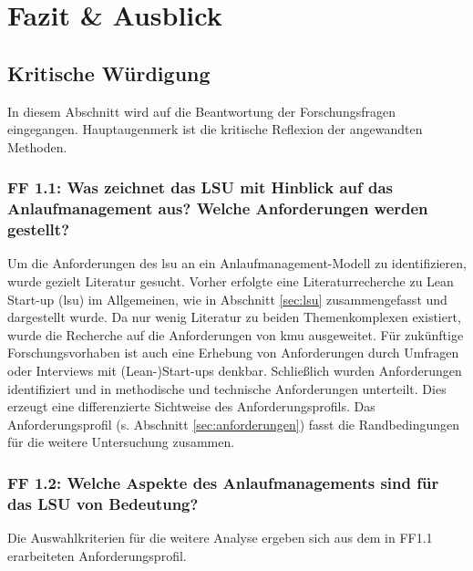 \chapter{Fazit \& Ausblick}\label{sec:fazit}

\section{Kritische Würdigung}

In diesem Abschnitt wird auf die Beantwortung der Forschungsfragen eingegangen. Hauptaugenmerk ist die kritische Reflexion der angewandten Methoden. 

\subsection*{FF 1.1: Was zeichnet das LSU mit Hinblick auf das Anlaufmanagement aus? Welche Anforderungen werden gestellt?}
Um die Anforderungen des \gls{lsu} an ein Anlaufmanagement-Modell zu identifizieren, wurde gezielt Literatur gesucht. 
Vorher erfolgte eine Literaturrecherche zu Lean Start-up (\gls{lsu}) im Allgemeinen, wie in Abschnitt \ref{sec:lsu} zusammengefasst und dargestellt wurde.
Da nur wenig Literatur zu beiden Themenkomplexen existiert, wurde die Recherche auf die Anforderungen von \gls{kmu} ausgeweitet. Für zukünftige Forschungsvorhaben ist auch eine Erhebung von Anforderungen durch Umfragen oder Interviews mit (Lean-)Start-ups denkbar. Schließlich wurden Anforderungen identifiziert und in methodische und technische Anforderungen unterteilt. Dies erzeugt eine differenzierte Sichtweise des Anforderungsprofils. Das Anforderungsprofil (s. Abschnitt \ref{sec:anforderungen}) fasst die Randbedingungen für die weitere Untersuchung zusammen. 

\subsection*{FF 1.2: Welche Aspekte des Anlaufmanagements sind für das LSU von Bedeutung?}
Die Auswahlkriterien für die weitere Analyse ergeben sich aus dem in FF1.1 erarbeiteten Anforderungsprofil. 

